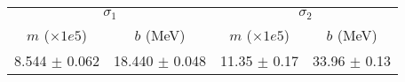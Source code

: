 \begin{tabular}{cc|cc}
\multicolumn{2}{c|}{$\sigma_1$} & \multicolumn{2}{|c}{$\sigma_2$} \\
$m$ ($\times1e5$) & $b$ (MeV) & $m$ ($\times1e5$) & $b$ (MeV) \\
\hline
8.544 $\pm$ 0.062 & 18.440 $\pm$ 0.048 & 11.35 $\pm$ 0.17 & 33.96 $\pm$ 0.13\\
\end{tabular}
